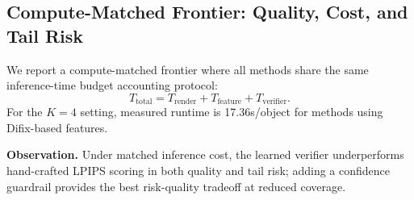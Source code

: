 \subsection{Compute-Matched Frontier: Quality, Cost, and Tail Risk}
\label{sec:frontier-qtr}

We report a compute-matched frontier where all methods share the same inference-time budget accounting protocol:
\begin{equation}
T_{\text{total}} = T_{\text{render}} + T_{\text{feature}} + T_{\text{verifier}}.
\end{equation}
For the $K{=}4$ setting, measured runtime is 17.36s/object for methods using Difix-based features.



\noindent\textbf{Observation.}
Under matched inference cost, the learned verifier underperforms hand-crafted LPIPS scoring in both quality and tail risk; adding a confidence guardrail provides the best risk-quality tradeoff at reduced coverage.
